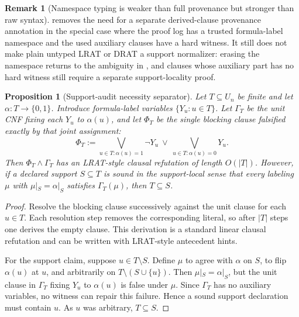 \documentclass[11pt]{article}
\newtheorem{proposition}[theorem]{Proposition}
\theoremstyle{definition}
\newtheorem{remark}[theorem]{Remark}
\newcommand{\bits}{\{0,1\}}
\begin{document}
\begin{remark}[Namespace typing is weaker than full provenance but stronger than raw syntax]\label{rem:namespace-typed-lrat-scope}
 removes the need for a separate derived-clause provenance annotation in the special case where the proof log has a trusted formula-label namespace and the used auxiliary clauses have a hard witness.  It still does not make plain untyped LRAT or DRAT a support normalizer: erasing the namespace returns to the ambiguity in , and clauses whose auxiliary part has no hard witness still require a separate support-locality proof.
\end{remark}

\begin{proposition}[Support-audit necessity separator]\label{prop:support-audit-necessity}
Let \(T\subseteq U_n\) be finite and let \(\alpha:T\to\bits\).  Introduce formula-label variables \(\{Y_u:u\in T\}\).  Let \(\Gamma_T\) be the unit CNF fixing each \(Y_u\) to \(\alpha(u)\), and let \(\Phi_T\) be the single blocking clause falsified exactly by that joint assignment:
\[
  \Phi_T
  :=
  \bigvee_{u\in T:\alpha(u)=1}\neg Y_u
  \ \vee\
  \bigvee_{u\in T:\alpha(u)=0}Y_u .
\]
Then \(\Phi_T\wedge\Gamma_T\) has an LRAT-style clausal refutation of length \(O(|T|)\).  However, if a declared support \(S\subseteq T\) is sound in the support-local sense that every labeling \(\mu\) with \(\mu|_S=\alpha|_S\) satisfies \(\Gamma_T(\mu)\), then \(T\subseteq S\).
\end{proposition}

\begin{proof}
Resolve the blocking clause successively against the unit clause for each \(u\in T\).  Each resolution step removes the corresponding literal, so after \(|T|\) steps one derives the empty clause.  This derivation is a standard linear clausal refutation and can be written with LRAT-style antecedent hints.

For the support claim, suppose \(u\in T\setminus S\).  Define \(\mu\) to agree with \(\alpha\) on \(S\), to flip \(\alpha(u)\) at \(u\), and arbitrarily on \(T\setminus(S\cup\{u\})\).  Then \(\mu|_S=\alpha|_S\), but the unit clause in \(\Gamma_T\) fixing \(Y_u\) to \(\alpha(u)\) is false under \(\mu\).  Since \(\Gamma_T\) has no auxiliary variables, no witness can repair this failure.  Hence a sound support declaration must contain \(u\).  As \(u\) was arbitrary, \(T\subseteq S\).
\end{proof}
\end{document}
